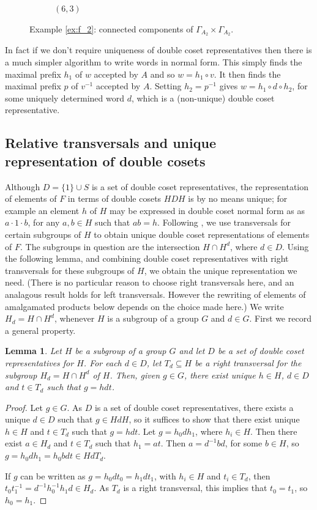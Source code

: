 \documentclass[a4paper,12pt]{article}
\newcommand{\G}{\Gamma }
\newtheorem{lemma}[theorem]{Lemma}
\numberwithin{equation}{section}
\numberwithin{figure}{section}
\begin{document}
\begin{figure}
\begin{center}
\begin{subfigure}[b]{.13\columnwidth}
\caption{$(6,3)$}
\label{fig:G2xG2-2-6}
\end{subfigure}
\end{center}
\caption{Example \ref{ex:f_2}: connected components of $\G_{A_2}\times \G_{A_2}$.}\label{fig:G2xG2-2}
\end{figure}

In fact if we don't require uniqueness of double coset representatives then
there is a much simpler algorithm to write words in normal form.
This simply finds the maximal prefix $h_1$ of $w$  accepted  by
$A$  and so $w=h_1\circ v$. It then finds the maximal prefix $p$
of $v^{-1}$ accepted by $A$. Setting $h_2=p^{-1}$ gives
$w=h_1\circ d \circ h_2$, for some uniquely determined word $d$,
which is a (non-unique) double coset representative.
%
%
\subsection{Relative transversals and unique representation of 
double cosets}\label{sub:reltran}
Although $D=\{1\}\cup S$ is a set of double coset representatives, the 
representation of elements of $F$ in terms of double cosets $HDH$ is by 
no means unique; for example an element $h$ of $H$ may be expressed in
double coset normal form as  
as $a\cdot 1 \cdot b$,  for any $a,b\in H$ such that $ab=h$.  
Following \cite{FrenkelRemeslennikov13}, we use transversals for certain subgroups of $H$ to 
obtain unique double coset representations of elements of $F$. The subgroups
in question are the intersection $H\cap H^d$, where $d\in D$. 
 Using the  following lemma, and combining double coset representatives
with right transversals for these subgroups of $H$, we obtain the unique
representation we need. (There is no particular reason to choose right 
transversals here, and an analagous result holds for left transversals. However
the rewriting of elements of amalgamated products below depends on the choice
made here.)    
We write  $H_d=H\cap H^d$, whenever $H$ is a subgroup of a group $G$ and
$d\in G$. 
First we record a general property.  
\begin{lemma}\label{lem:dcrel}
Let $H$ be a subgroup of a group $G$ and let $D$ be a set of
double coset representatives for $H$. For each $d\in D$, let 
$T_d\subseteq H$ be a right transversal for the subgroup $H_d=H\cap H^d$ of $H$.
Then, given $g\in G$, there exist  unique $h\in H$, $d\in D$ and 
$t\in T_d$ such that  $g=hdt$. 
\end{lemma}
\begin{proof}
Let $g\in G$. As $D$ is a set of double coset representatives, there
exists a unique $d\in D$ such that $g\in HdH$, so it suffices to
show that there exist unique $h\in H$ and $t\in T_d$ such that 
$g=hdt$. Let $g=h_0dh_1$, where $h_i\in H$. Then there exist $a\in H_d$ 
and   $t\in T_d$ such that $h_1=at$. Then $a=d^{-1}bd$, for some $b\in H$,
so $g=h_0dh_1=h_0bdt\in HdT_d$. 

If $g$ can be written as  $g=h_0dt_0=h_1dt_1$, with $h_i\in H$ and 
$t_i\in T_d$, then $t_0t_1^{-1}=d^{-1}h_0^{-1}h_1d\in H_d$. As 
$T_d$ is a right transversal, this implies that $t_0=t_1$, so $h_0=h_1$. 
\end{proof}
\end{document}
